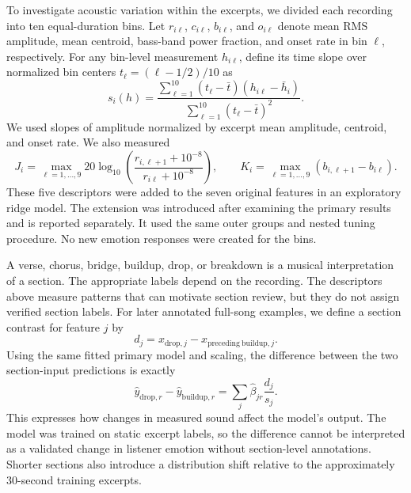 To investigate acoustic variation within the excerpts, we divided each recording into ten equal-duration bins. Let $r_{i\ell}$, $c_{i\ell}$, $b_{i\ell}$, and $o_{i\ell}$ denote mean RMS amplitude, mean centroid, bass-band power fraction, and onset rate in bin $\ell$, respectively. For any bin-level measurement $h_{i\ell}$, define its time slope over normalized bin centers $t_\ell=(\ell-1/2)/10$ as
\begin{equation}
 s_i(h)=\frac{\sum_{\ell=1}^{10}(t_\ell-\bar t)(h_{i\ell}-\bar h_i)}
 {\sum_{\ell=1}^{10}(t_\ell-\bar t)^2}.
\end{equation}
We used slopes of amplitude normalized by excerpt mean amplitude, centroid, and onset rate. We also measured
\begin{equation}
 J_i=\max_{\ell=1,\ldots,9}
 20\log_{10}\!\left(\frac{r_{i,\ell+1}+10^{-8}}{r_{i\ell}+10^{-8}}\right),
 \qquad
 K_i=\max_{\ell=1,\ldots,9}(b_{i,\ell+1}-b_{i\ell}).
\end{equation}
These five descriptors were added to the seven original features in an exploratory ridge model. The extension was introduced after examining the primary results and is reported separately. It used the same outer groups and nested tuning procedure. No new emotion responses were created for the bins.

A verse, chorus, bridge, buildup, drop, or breakdown is a musical interpretation of a section. The appropriate labels depend on the recording. The descriptors above measure patterns that can motivate section review, but they do not assign verified section labels. For later annotated full-song examples, we define a section contrast for feature $j$ by
\begin{equation}
 d_j=x_{\mathrm{drop},j}-x_{\mathrm{preceding\ buildup},j}.
\end{equation}
Using the same fitted primary model and scaling, the difference between the two section-input predictions is exactly
\begin{equation}
 \widehat y_{\mathrm{drop},r}-\widehat y_{\mathrm{buildup},r}
 =\sum_j\widehat\beta_{jr}\frac{d_j}{s_j}.
\end{equation}
This expresses how changes in measured sound affect the model's output. The model was trained on static excerpt labels, so the difference cannot be interpreted as a validated change in listener emotion without section-level annotations. Shorter sections also introduce a distribution shift relative to the approximately 30-second training excerpts.

